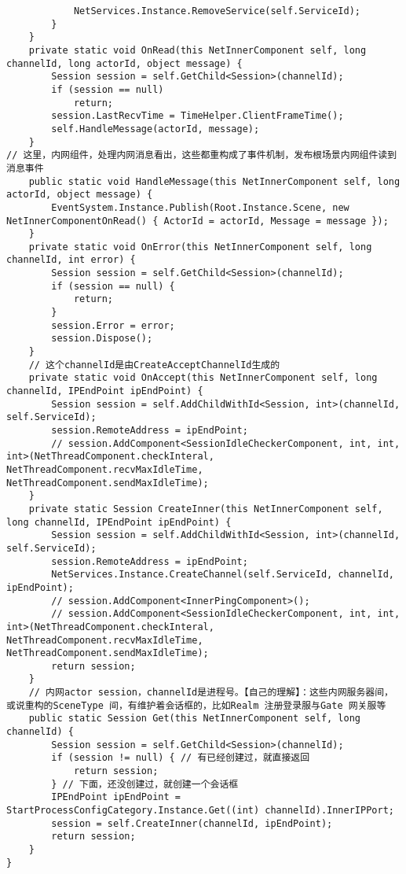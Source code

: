 \documentclass[9pt, b5paper]{article}
\begin{document}
\begin{itemize}
\begin{verbatim}
            NetServices.Instance.RemoveService(self.ServiceId);
        }
    }
    private static void OnRead(this NetInnerComponent self, long channelId, long actorId, object message) {
        Session session = self.GetChild<Session>(channelId);
        if (session == null) 
            return;
        session.LastRecvTime = TimeHelper.ClientFrameTime();
        self.HandleMessage(actorId, message);
    }
// 这里，内网组件，处理内网消息看出，这些都重构成了事件机制，发布根场景内网组件读到消息事件
    public static void HandleMessage(this NetInnerComponent self, long actorId, object message) {
        EventSystem.Instance.Publish(Root.Instance.Scene, new NetInnerComponentOnRead() { ActorId = actorId, Message = message });
    }
    private static void OnError(this NetInnerComponent self, long channelId, int error) {
        Session session = self.GetChild<Session>(channelId);
        if (session == null) {
            return;
        }
        session.Error = error;
        session.Dispose();
    }
    // 这个channelId是由CreateAcceptChannelId生成的
    private static void OnAccept(this NetInnerComponent self, long channelId, IPEndPoint ipEndPoint) {
        Session session = self.AddChildWithId<Session, int>(channelId, self.ServiceId);
        session.RemoteAddress = ipEndPoint;
        // session.AddComponent<SessionIdleCheckerComponent, int, int, int>(NetThreadComponent.checkInteral, NetThreadComponent.recvMaxIdleTime, NetThreadComponent.sendMaxIdleTime);
    }
    private static Session CreateInner(this NetInnerComponent self, long channelId, IPEndPoint ipEndPoint) {
        Session session = self.AddChildWithId<Session, int>(channelId, self.ServiceId);
        session.RemoteAddress = ipEndPoint;
        NetServices.Instance.CreateChannel(self.ServiceId, channelId, ipEndPoint);
        // session.AddComponent<InnerPingComponent>();
        // session.AddComponent<SessionIdleCheckerComponent, int, int, int>(NetThreadComponent.checkInteral, NetThreadComponent.recvMaxIdleTime, NetThreadComponent.sendMaxIdleTime);
        return session;
    }
    // 内网actor session，channelId是进程号。【自己的理解】：这些内网服务器间，或说重构的SceneType 间，有维护着会话框的，比如Realm 注册登录服与Gate 网关服等
    public static Session Get(this NetInnerComponent self, long channelId) {
        Session session = self.GetChild<Session>(channelId);
        if (session != null) { // 有已经创建过，就直接返回
            return session;
        } // 下面，还没创建过，就创建一个会话框
        IPEndPoint ipEndPoint = StartProcessConfigCategory.Instance.Get((int) channelId).InnerIPPort;
        session = self.CreateInner(channelId, ipEndPoint);
        return session;
    }
}
\end{verbatim}
\end{itemize}
\end{document}
